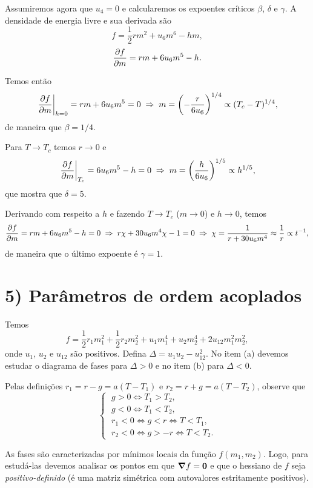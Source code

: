 \documentclass[a4paper,10pt]{article}
\begin{document}
\n

Assumiremos agora que $u_4 = 0$ e calcularemos os expoentes críticos $\beta$, $\delta$ e $\gamma$. A densidade de energia livre e sua derivada são
$$
f = \frac{1}{2} rm^2 + u_6 m^6 - h m,
$$
$$
\pdv{f}{m} = rm + 6 u_6 m^5 - h.
$$

\n

Temos então
$$
\eval{\pdv{f}{m}}_{h=0} = rm + 6 u_6 m^5 = 0 \implies m = \qty(-\frac{r}{6u_6})^{1/4} \propto (T_c - T)^{1/4},
$$
de maneira que $\beta = 1/4$.

\n

Para $T \to T_c$ temos $r \to 0$ e
$$
\eval{\pdv{f}{m}}_{T_c} = 6 u_6 m^5 - h = 0 \implies m = \qty(\frac{h}{6u_6})^{1/5} \propto h^{1/5},
$$
que mostra que $\delta = 5$.

\n

Derivando com respeito a $h$ e fazendo $T \to T_c$ ($m \to 0$) e $h \to 0$, temos
$$
\pdv{f}{m} = rm + 6 u_6 m^5 - h = 0 \; \Rightarrow \; r \chi + 30 u_6 m^4 \chi - 1 = 0 \; \Rightarrow \;
\chi = \frac{1}{r + 30 u_6 m^4} \approx \frac{1}{r} \propto t^{-1},
$$
de maneira que o último expoente é $\gamma = 1$.



\pagebreak

\section*{5) Parâmetros de ordem acoplados}

Temos
$$
f = \frac{1}{2} r_1 m_1^2 + \frac{1}{2} r_2 m_2^2 + u_1 m_1^4 + u_2 m_2^4 + 2 u_{12} m_1^2 m_2^2,
$$
onde $u_1$, $u_2$ e $u_{12}$ são positivos. Defina $\boxed{\Delta = u_1 u_2 - u_{12}^2}$. No item (a) devemos estudar o diagrama de fases para $\Delta > 0$ e no item (b) para $\Delta < 0$.

\n

Pelas definições $r_1 = r - g = a(T-T_1)$ e $r_2 = r+g = a(T-T_2)$, observe que
$$
\begin{cases}
\; g > 0 \iff T_1 > T_2, \\
\; g < 0 \iff T_1 < T_2, \\
\; r_1 < 0 \iff g < r \iff T < T_1, \\
\; r_2 < 0 \iff g > -r \iff T < T_2.
\end{cases}
$$


As fases são caracterizadas por mínimos locais da função $f(m_1, m_2)$. Logo, para estudá-las devemos analisar os pontos em que $\grad{f} = \vb{0}$ e que o hessiano de $f$ seja \textit{positivo-definido} (é uma matriz simétrica com autovalores estritamente positivos).
\end{document}

